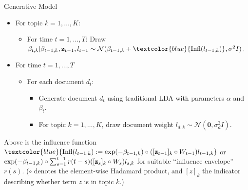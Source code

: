 \documentclass[final,t]{beamer}
\newcommand{\z}{\bold{z}}
\begin{document}
\begin{frame}{}
\begin{columns}[t]
\begin{column}{.29\linewidth}
\begin{block}{Generative Model}
\begin{itemize}
\item  For topic $k = 1, \ldots, K$: \label{gen:beta} \\
  \begin{itemize}
  \item For time $t = 1, \ldots, T$:
    Draw $\beta_{t,k} | \beta_{t-1,k}, \z_{t-1}, l_{t-1} \sim
    \mathcal{N}(\beta_{t-1,k} + \textcolor{blue}{\mbox{Infl}(l_{t-1, k})}, \sigma^2 I)$.
  \end{itemize}
\end{itemize}
\begin{itemize}
\item  For time $t=1, \ldots, T$
  \begin{itemize}
  \item For each document $d_t$:
    \begin{itemize}
    \item Generate document $d_t$ using traditional LDA with parameters
      $\alpha$ and $\beta_{t}$.
    \item For topic $k = 1, \ldots, K$,  \label{gen:l}
      draw document weight $l_{d,k} \sim \mathcal{N}(\textbf{0}, \sigma_d^2 I)$.
    \end{itemize}
  \end{itemize}
\end{itemize}

\hspace{-2.0cm} \parbox{0.93\textwidth}{
Above is the influence function \small $\textcolor{blue}{\mbox{Infl}(l_{t-1, k}) :=
\exp(-\beta_{t-1, k}) \circ ([\z_{t-1}]_k \circ W_{t-1}) l_{t-1,k}}$ \normalsize or
\small \textcolor{blue}{$\exp(-\beta_{t-1, k}) \circ \sum_{s=1}^{t-1} r(t-s) ([\z_{s}]_k \circ W_{s})  l_{s, k}$} \normalsize
for suitable ``influence envelope'' $r(s)$. ($\circ$ denotes the element-wise
 Hadamard product, and $[z]_k$ the indicator describing whether term $z$ is in topic $k$.)
}
\end{block}


    \end{column}


\end{columns}
\end{frame}
\end{document}
